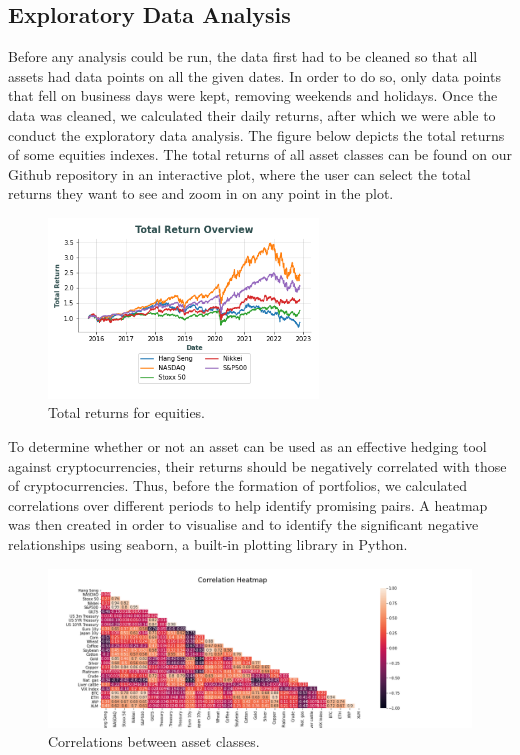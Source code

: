 \documentclass[11pt]{article}
\begin{document}
\subsection{Exploratory Data Analysis}
Before any analysis could be run, the data first had to be cleaned so that all assets had data points on all the given dates. In order to do so, only data points that fell on business days were kept, removing weekends and holidays. Once the data was cleaned, we calculated their daily returns, after which we were able to conduct the exploratory data analysis. The figure below depicts the total returns of some equities indexes. The total returns of all asset classes can be found on our Github repository \cite{CryptoGithub} in an interactive plot, where the user can select the total returns they want to see and zoom in on any point in the plot. 

\begin{figure}[H]
    \includegraphics[width=0.64\textwidth]
    {images/Equities.png}
    \centering
    \caption{Total returns for equities.}
    \label{Equities}
\end{figure}

To determine whether or not an asset can be used as an effective hedging tool against cryptocurrencies, their returns should be negatively correlated with those of cryptocurrencies. Thus, before the formation of portfolios, we calculated correlations over different periods to help identify promising pairs. A heatmap was then created in order to visualise and to identify the significant negative relationships using seaborn, a built-in plotting library in Python.

\begin{figure}[H]
\hspace{-5mm}%
    \includegraphics[width=1.25\textwidth]{images/corrHeatmap.png}  
  \caption{Correlations between asset classes.}
  \label{Correlations}
\end{figure}
\end{document}

